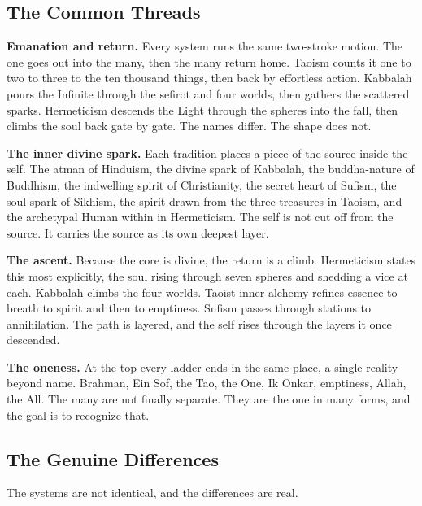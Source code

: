 \subsection{The Common Threads}

\textbf{Emanation and return.} Every system runs the same two-stroke motion. The one goes out into the many, then the many return home. Taoism counts it one to two to three to the ten thousand things, then back by effortless action. Kabbalah pours the Infinite through the sefirot and four worlds, then gathers the scattered sparks. Hermeticism descends the Light through the spheres into the fall, then climbs the soul back gate by gate. The names differ. The shape does not.

\textbf{The inner divine spark.} Each tradition places a piece of the source inside the self. The atman of Hinduism, the divine spark of Kabbalah, the buddha-nature of Buddhism, the indwelling spirit of Christianity, the secret heart of Sufism, the soul-spark of Sikhism, the spirit drawn from the three treasures in Taoism, and the archetypal Human within in Hermeticism. The self is not cut off from the source. It carries the source as its own deepest layer.

\textbf{The ascent.} Because the core is divine, the return is a climb. Hermeticism states this most explicitly, the soul rising through seven spheres and shedding a vice at each. Kabbalah climbs the four worlds. Taoist inner alchemy refines essence to breath to spirit and then to emptiness. Sufism passes through stations to annihilation. The path is layered, and the self rises through the layers it once descended.

\textbf{The oneness.} At the top every ladder ends in the same place, a single reality beyond name. Brahman, Ein Sof, the Tao, the One, Ik Onkar, emptiness, Allah, the All. The many are not finally separate. They are the one in many forms, and the goal is to recognize that.

\subsection{The Genuine Differences}

The systems are not identical, and the differences are real.

